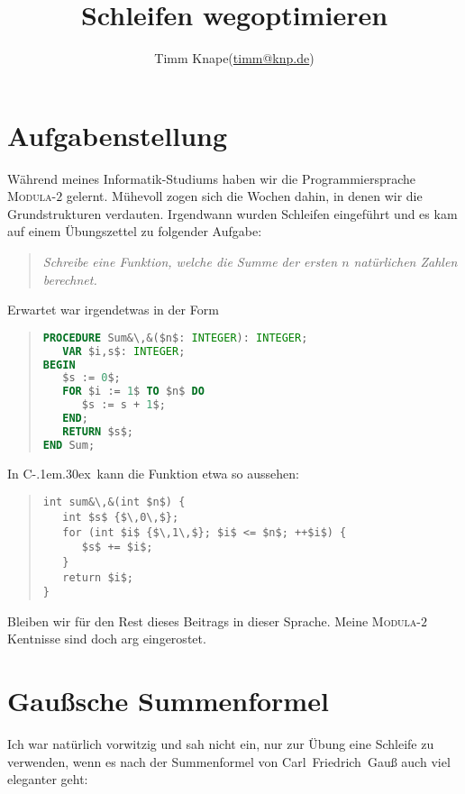 \documentclass[a5paper,landscape,ngerman,10pt]{article}
\title{Schleifen wegoptimieren}
\author{Timm Knape\quad(\href{mailto:timm@knp.de}{timm@knp.de})}
\begin{document}
\newcommand{\cpp}{C\kern-.1em\raise.30ex\hbox{\smaller{++}}}
\lstset{
  columns=fullflexible,
  language=[11]C++,
  mathescape=true,
  escapechar=\&
}
%
\maketitle
%
\section{Aufgabenstellung}
%
Während meines Informatik-Studiums haben wir die
Programmiersprache \hbox{\textsc{Modula-$2$}} gelernt.
Mühevoll zogen sich die Wochen dahin, in denen wir die
Grundstrukturen verdauten.
Irgendwann wurden Schleifen eingeführt und es kam auf
einem Übungszettel zu folgender Aufgabe:

\begin{quotation}
\textit{Schreibe eine Funktion, welche die 
Summe der ersten $n$ natürlichen Zahlen berechnet.}
\end{quotation}

Erwartet war irgendetwas in der Form

\begin{quotation}
\begin{lstlisting}[language=Modula-2, morekeywords={TO}]
PROCEDURE Sum&\,&($n$: INTEGER): INTEGER;
   VAR $i,s$: INTEGER;
BEGIN
   $s := 0$;
   FOR $i := 1$ TO $n$ DO
      $s := s + 1$;
   END;
   RETURN $s$;
END Sum;
\end{lstlisting}
\end{quotation}

In \cpp\ kann die Funktion etwa so aussehen:

\begin{quotation}
\begin{lstlisting}
int sum&\,&(int $n$) {
   int $s$ {$\,0\,$};
   for (int $i$ {$\,1\,$}; $i$ <= $n$; ++$i$) {
      $s$ += $i$;
   }
   return $i$;
}
\end{lstlisting}
\end{quotation}

Bleiben wir für den Rest dieses Beitrags in dieser Sprache.
Meine \textsc{Modula-$2$} Kentnisse sind doch arg eingerostet.

\section{Gaußsche Summenformel}

Ich war natürlich vorwitzig und sah nicht ein,
nur zur Übung eine Schleife zu verwenden,
wenn es nach der Summenformel von Carl~Friedrich~Gauß auch viel eleganter
geht:
\end{document}
